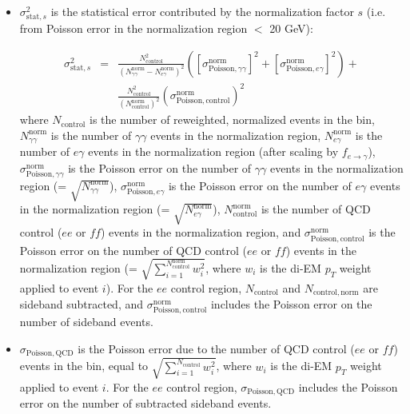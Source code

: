 \documentclass[dissertation_bw.tex]{subfiles}
\begin{document}
\begin{itemize}

\item $\sigma_{\mathrm{stat,}s}^{2}$ is the statistical error contributed by the normalization factor $s$ (i.e. from Poisson error in the normalization region \MET $<$ 20 GeV):

\begin{eqnarray}
\sigma_{\mathrm{stat,}s}^{2} &=& \frac{N_{\mathrm{control}}^{2}}{(N_{\gamma\gamma}^{\mathrm{norm}} - N_{e\gamma}^{\mathrm{norm}})^{2}}(\left[\sigma_{\mathrm{Poisson,}\gamma\gamma}^{\mathrm{norm}}\right]^{2} + \left[\sigma_{\mathrm{Poisson,}e\gamma}^{\mathrm{norm}}\right]^{2}) + \nonumber \\
&&\frac{N_{\mathrm{control}}^{2}}{(N_{\mathrm{control}}^{\mathrm{norm}})^{2}}(\sigma_{\mathrm{Poisson,control}}^{\mathrm{norm}})^{2}
\label{eq:norm_stat_error}
\end{eqnarray}
%
where $N_{\mathrm{control}}$ is the number of reweighted, normalized events in the \MET bin, $N_{\gamma\gamma}^{\mathrm{norm}}$ is the number of $\gamma\gamma$ events in the normalization region, $N_{e\gamma}^{\mathrm{norm}}$ is the number of $e\gamma$ events in the normalization region (after scaling by $f_{e\rightarrow\gamma}$), $\sigma_{\mathrm{Poisson,}\gamma\gamma}^{\mathrm{norm}}$ is the Poisson error on the number of $\gamma\gamma$ events in the normalization region (= $\sqrt{N_{\gamma\gamma}^{\mathrm{norm}}}$), $\sigma_{\mathrm{Poisson,}e\gamma}^{\mathrm{norm}}$ is the Poisson error on the number of $e\gamma$ events in the normalization region (= $\sqrt{N_{e\gamma}^{\mathrm{norm}}}$), $N_{\mathrm{control}}^{\mathrm{norm}}$ is the number of QCD control ($ee$ or $\mathit{ff}$) events in the normalization region, and $\sigma_{\mathrm{Poisson,control}}^{\mathrm{norm}}$ is the Poisson error on the number of QCD control ($ee$ or $\mathit{ff}$) events in the normalization region (= $\sqrt{\sum_{i = 1}^{N_{\mathrm{control}}^{\mathrm{norm}}}w_{i}^{2}}$, where $w_{i}$ is the di-EM $p_{T}$ weight applied to event $i$).  For the $ee$ control region, $N_{\mathrm{control}}$ and $N_{\mathrm{control,norm}}$ are sideband subtracted, and $\sigma_{\mathrm{Poisson,control}}^{\mathrm{norm}}$ includes the Poisson error on the number of sideband events.

\item $\sigma_{\mathrm{Poisson,QCD}}$ is the Poisson error due to the number of QCD control ($ee$ or $\mathit{ff}$) events in the \MET bin, equal to $\sqrt{\sum_{i = 1}^{N_{\mathrm{control}}}w_{i}^{2}}$, where $w_{i}$ is the di-EM $p_{T}$ weight applied to event $i$.  For the $ee$ control region, $\sigma_{\mathrm{Poisson,QCD}}$ includes the Poisson error on the number of subtracted  sideband events.


\end{itemize}
\end{document}
